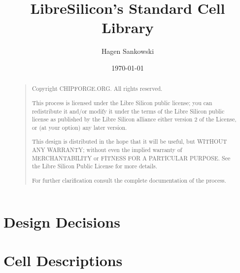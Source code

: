 \documentclass[10pt,a4paper,twoside]{article}
\title{LibreSilicon's Standard Cell Library}
\author{Hagen Sankowski}
\date{\today}
\begin{document}
\maketitle

\begin{abstract}
\begin{quote}
Copyright  CHIPFORGE.ORG. All rights reserved.

This process is licensed under the Libre Silicon public license; you can redistribute it and/or modify it under the terms of the Libre Silicon public license as published by the Libre Silicon alliance either version 2 of the License, or (at your option) any later version.

This design is distributed in the hope that it will be useful, but WITHOUT ANY WARRANTY; without even the implied warranty of MERCHANTABILITY or FITNESS FOR A PARTICULAR PURPOSE. See the Libre Silicon Public License for more details.

For further clarification consult the complete documentation of the process.
\end{quote}
\end{abstract}



\clearpage


\clearpage
\section{Design Decisions}

\section{Cell Descriptions}

\clearpage


%
\end{document}
